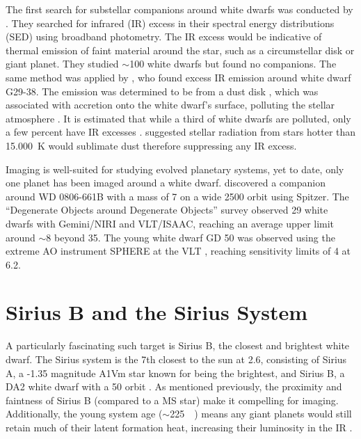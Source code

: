 \documentclass[twocolumn]{aastex631}
\begin{document}
The first search for substellar companions around white dwarfs was conducted by \citet{probst_infrared_1983}. They searched for infrared (IR) excess in their spectral energy distributions (SED) using broadband photometry. The IR excess would be indicative of thermal emission of faint material around the star, such as a circumstellar disk or giant planet. They studied $\sim$100 white dwarfs but found no companions. The same method was applied by \citet{zuckerman_excess_1987}, who found excess IR emission around white dwarf G29-38. The emission was determined to be from a dust disk \citep{telesco_observations_1990}, which was associated with accretion onto the white dwarf's surface, polluting the stellar atmosphere \citep{koester_metals_1997}. It is estimated that while a third of white dwarfs are polluted, only a few percent have IR excesses \citep{bonsor_pollution_2015}. \citet{skemer_sirius_2011} suggested stellar radiation from stars hotter than \qty{15,000}{\kelvin} would sublimate dust therefore suppressing any IR excess.

Imaging is well-suited for studying evolved planetary systems, yet to date, only one planet has been imaged around a white dwarf. \citet{luhman_discovery_2011} discovered a companion around WD 0806-661B with a mass of \qty{7}{\jupitermass} on a wide \qty{2500}{\au} orbit using Spitzer. The ``Degenerate Objects around Degenerate Objects'' survey \citep[DODO;][]{hogan_dodo_2009} observed 29 white dwarfs with Gemini/NIRI and VLT/ISAAC, reaching an average upper limit around $\sim$\qty{8}{\jupitermass} beyond \qty{35}{\au}. The young white dwarf GD 50 was observed using the extreme AO instrument SPHERE at the VLT \citep{xu_extreme-ao_2015}, reaching sensitivity limits of \qty{4}{\jupitermass} at \qty{6.2}{\au}.

\section{Sirius B and the Sirius System}

A particularly fascinating such target is Sirius B, the closest and brightest white dwarf. The Sirius system is the 7th closest to the sun at \qty{2.6}{\parsec}, consisting of Sirius A, a -1.35 magnitude A1Vm star known for being the brightest, and Sirius B, a DA2 white dwarf with a \qty{50}{\year} orbit \citep{bond_sirius_2017,gaia_collaboration_gaia_2018}. As mentioned previously, the proximity and faintness of Sirius B (compared to a MS star) make it compelling for imaging. Additionally, the young system age ($\sim$\qty{225}{\mega\year}) means any giant planets would still retain much of their latent formation heat, increasing their luminosity in the IR \citep{fortney_giant_2010}.
\end{document}
